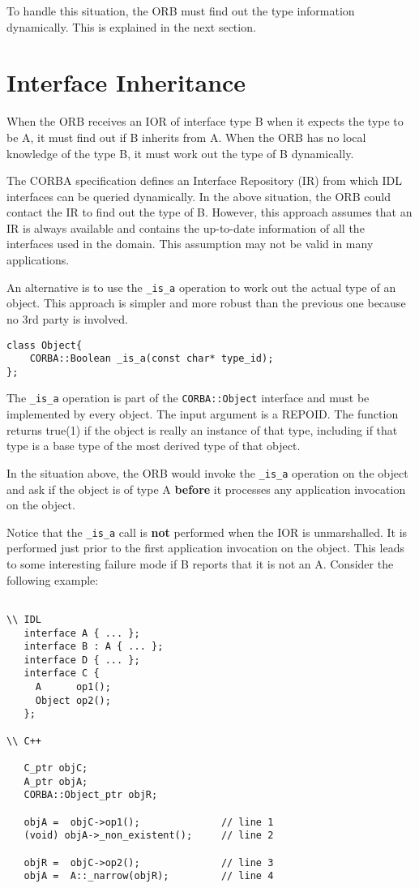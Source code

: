\documentclass[11pt,twoside,onecolumn]{book}
\begin{document}
To handle this situation, the ORB must find out the type information
dynamically. This is explained in the next section.

\section{Interface Inheritance}

When the ORB receives an IOR of interface type B when it expects the type to
be A, it must find out if B inherits from A. When the ORB has no local
knowledge of the type B, it must work out the type of B dynamically.

The CORBA specification defines an Interface Repository (IR) from which IDL
interfaces can be queried dynamically. In the above situation, the ORB
could contact the IR to find out the type of B. However, this approach
assumes that an IR is always available and contains the up-to-date
information of all the interfaces used in the domain. This assumption may
not be valid in many applications.

An alternative is to use the {\tt \_is\_a} operation to
work out the actual type of an object. This approach is simpler
and more robust than the previous one because no 3rd party is involved. 

{\small
\begin{verbatim}
class Object{
    CORBA::Boolean _is_a(const char* type_id);
};
\end{verbatim}
}

The {\tt \_is\_a} operation is part of the {\tt CORBA::Object} interface
and must be implemented by every object. The input argument is a
REPOID. The function returns true(1) if the object is really an instance of
that type, including if that type is a base type of the most derived type
of that object.

In the situation above, the ORB would invoke the {\tt \_is\_a}
operation on the object and ask if the object is of type A {\bf before}
it processes any application invocation on the object.

Notice that the {\tt \_is\_a} call is {\bf not} performed when the IOR is
unmarshalled. It is performed just prior to the first application
invocation on the object. This leads to some interesting failure mode if
B reports that it is not an A. Consider the following example:

{\small
\begin{verbatim}

\\ IDL
   interface A { ... };
   interface B : A { ... };
   interface D { ... };
   interface C {
     A      op1();
     Object op2();
   };

\\ C++

   C_ptr objC;
   A_ptr objA;
   CORBA::Object_ptr objR;

   objA =  objC->op1();              // line 1
   (void) objA->_non_existent();     // line 2

   objR =  objC->op2();              // line 3
   objA =  A::_narrow(objR);         // line 4

\end{verbatim}
}
\end{document}
